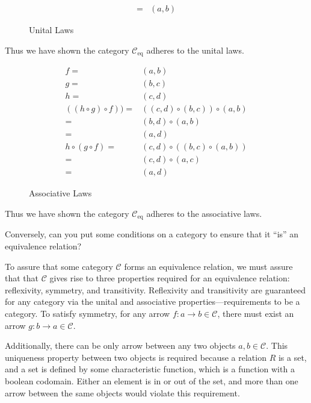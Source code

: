 \begin{proofitem}
\begin{figure}[H]
\begin{align*}
    =&(a, b)
\end{align*}
\caption{Unital Laws}
\end{figure}
\item Thus we have shown the category $\mathcal{C}_{\text{eq}}$ adheres to the unital laws.
\begin{figure}[H]
\begin{align*}
    f=&(a, b)\\
    g=&(b, c)\\
    h=&(c, d)\\
    \left((h\circ g)\circ f\right)) =&((c,d)\circ(b,c))\circ (a, b)\\
    =&(b,d)\circ (a, b)\\
    =&(a, d)\\
    h\circ (g\circ f)=&(c, d)\circ((b,c)\circ(a,b))\\
    =&(c, d)\circ(a,c)\\
    =&(a, d)
\end{align*}
\caption{Associative Laws}
\end{figure}
\item Thus we have shown the category $\mathcal{C}_{\text{eq}}$ adheres to the
    associative laws.

\setcounter{tttacounter}{0}
\begin{ttta}
Conversely, can you put some conditions on a category to ensure that it
    “is” an equivalence relation?
\end{ttta}
\item To assure that some category $\mathcal{C}$ forms an equivalence relation,
    we must assure that that $\mathcal{C}$ gives rise to three properties
    required for an equivalence relation: reflexivity, symmetry, and
    transitivity. Reflexivity and transitivity are guaranteed for any category
    via the unital and associative properties---requirements to be a category. To
    satisfy symmetry, for any arrow $f:a\rightarrow b\in \mathcal{C}$, there
    must exist an arrow $g:b\rightarrow a\in \mathcal{C}$.

    Additionally, there can be only arrow between any two objects $a, b \in
    \mathcal{C}$. This uniqueness property between two objects is required
    because a relation $R$ is a set, and a set is defined by some characteristic
    function, which is a function with a boolean codomain. Either an element is
    in or out of the set, and more than one arrow between the same objects would
    violate this requirement.
\end{proofitem}

